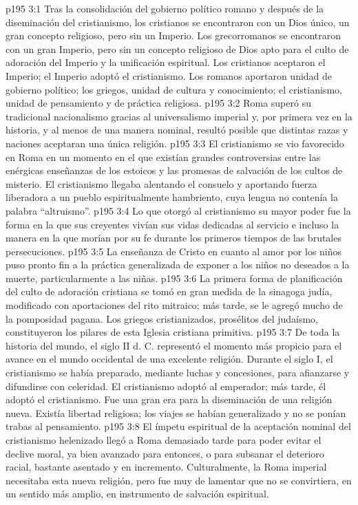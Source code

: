 \vs p195 3:1 Tras la consolidación del gobierno político romano y después de la diseminación del cristianismo, los cristianos se encontraron con un Dios único, un gran concepto religioso, pero sin un Imperio. Los grecorromanos se encontraron con un gran Imperio, pero sin un concepto religioso de Dios apto para el culto de adoración del Imperio y la unificación espiritual. Los cristianos aceptaron el Imperio; el Imperio adoptó el cristianismo. Los romanos aportaron unidad de gobierno político; los griegos, unidad de cultura y conocimiento; el cristianismo, unidad de pensamiento y de práctica religiosa.
\vs p195 3:2 Roma superó su tradicional nacionalismo gracias al universalismo imperial y, por primera vez en la historia, y al menos de una manera nominal, resultó posible que distintas razas y naciones aceptaran una única religión.
\vs p195 3:3 El cristianismo se vio favorecido en Roma en un momento en el que existían grandes controversias entre las enérgicas enseñanzas de los estoicos y las promesas de salvación de los cultos de misterio. El cristianismo llegaba alentando el consuelo y aportando fuerza liberadora a un pueblo espiritualmente hambriento, cuya lengua no contenía la palabra “altruismo”.
\vs p195 3:4 \pc Lo que otorgó al cristianismo su mayor poder fue la forma en la que sus creyentes vivían sus vidas dedicadas al servicio e incluso la manera en la que morían por su fe durante los primeros tiempos de las brutales persecuciones.
\vs p195 3:5 \pc La enseñanza de Cristo en cuanto al amor por los niños puso pronto fin a la práctica generalizada de exponer a los niños no deseados a la muerte, particularmente a las niñas.
\vs p195 3:6 \pc La primera forma de planificación del culto de adoración cristiana se tomó en gran medida de la sinagoga judía, modificado con aportaciones del rito mitraico; más tarde, se le agregó mucho de la pomposidad pagana. Los griegos cristianizados, prosélitos del judaísmo, constituyeron los pilares de esta Iglesia cristiana primitiva.
\vs p195 3:7 \pc De toda la historia del mundo, el siglo II d. C. representó el momento más propicio para el avance en el mundo occidental de una excelente religión. Durante el siglo I, el cristianismo se había preparado, mediante luchas y concesiones, para afianzarse y difundirse con celeridad. El cristianismo adoptó al emperador; más tarde, él adoptó el cristianismo. Fue una gran era para la diseminación de una religión nueva. Existía libertad religiosa; los viajes se habían generalizado y no se ponían trabas al pensamiento.
\vs p195 3:8 El ímpetu espiritual de la aceptación nominal del cristianismo helenizado llegó a Roma demasiado tarde para poder evitar el declive moral, ya bien avanzado para entonces, o para subsanar el deterioro racial, bastante asentado y en incremento. Culturalmente, la Roma imperial necesitaba esta nueva religión, pero fue muy de lamentar que no se convirtiera, en un sentido más amplio, en instrumento de salvación espiritual.
